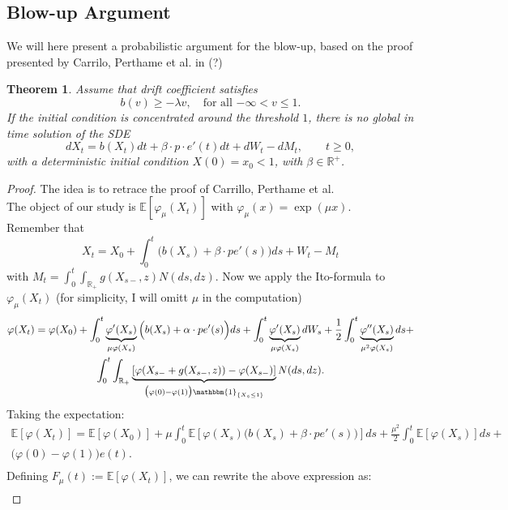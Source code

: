 \documentclass[11pt, a4paper]{article}
\newtheorem{theorem}{Theorem}
\begin{document}
\subsection{Blow-up Argument}
We will here present a probabilistic argument for the blow-up, based on the proof presented by Carrilo, Perthame et al. in (?)
\begin{theorem}
Assume that drift coefficient satisfies
\[b(v) \geq -\lambda v, \quad \text{for all $-\infty<v\leq1$.}\]
If the initial condition is concentrated around the threshold $1$, there is no global in time solution of the SDE
\[dX_t = b(X_t)dt + \beta\cdot p\cdot e'(t) dt + dW_t - d M_t, \qquad t\geq 0,\]
with a deterministic initial condition $X(0) = x_0 < 1$, with $\beta \in \mathbb{R}^+$.
\end{theorem}
\begin{proof}
The idea is to retrace the proof of Carrillo, Perthame et al.\\
The object of our study is $\mathbb{E}[\varphi_\mu(X_t)]$ with $\varphi_\mu(x)=\exp(\mu x)$. \\
Remember that
\[X_t = X_0 + \int_0^t \Big( b(X_s) + \beta\cdot p e'(s) \Big) ds + W_t - M_t\]
with $M_t=\int_0^t\int_{\mathbb{R}_+}g(X_{s-},z)N(ds,dz)$.
Now we apply the Ito-formula to $\varphi_\mu(X_t)$ (for simplicity, I will omitt $\mu$ in the computation)
\begin{multline*}
\varphi(X_t)=\varphi(X_0)+\int_0^t\underbrace{\varphi'(X_s)}_{\mu\varphi(X_s)} \Big( b(X_s) + \alpha\cdot p e'(s) \Big) ds+\int_0^t \underbrace{\varphi'(X_s)}_{\mu \varphi(X_s)}dW_s+\frac{1}{2}\int_0^t \underbrace{\varphi''(X_s)}_{\mu^2 \varphi(X_s)} ds+\\
\int_0^t \int_{\mathbb{R_+}}\underbrace{[\varphi(X_{s-}+g(X_{s-},z))-\varphi(X_{s-})]}_{\big( \varphi(0)-\varphi(1) \big) \mathbbm{1}_{ \left\{ X_s\leq 1 \right\} }}N(ds,dz).\\
\end{multline*}
Taking the expectation:
\begin{multline*}
\mathbb{E}\left[\varphi(X_t)\right]=\mathbb{E}\left[\varphi(X_0)\right]+\mu\int_0^t\mathbb{E}\left[\varphi(X_s) \Big( b(X_s) + \beta\cdot p e'(s) \Big)\right]ds+\frac{\mu^2}{2}\int_0^t \mathbb{E}\left[\varphi(X_s)\right] ds+\\
\Big(\varphi(0)-\varphi(1)\Big)e(t).\\
\end{multline*}
Defining $F_\mu(t):=\mathbb{E}[\varphi(X_t)]$, we can rewrite the above expression as:
\begin{multline*}

\end{multline*}
\end{proof}
\end{document}

